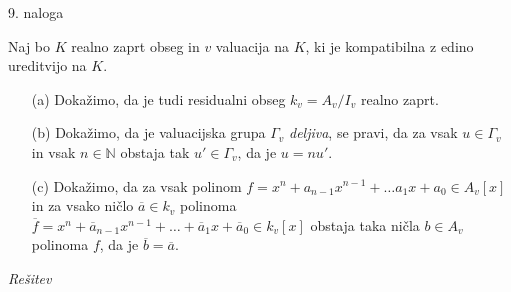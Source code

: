 \documentclass[a4paper, 12pt]{article}
\newcommand{\N}{\mathbb{N}}
\begin{document}
\begin{flushleft}
9. naloga
\end{flushleft}
Naj bo $K$ realno zaprt obseg in $v$ valuacija na $K$, ki je kompatibilna z edino ureditvijo na $K$. 
\begin{enumerate}
\item[(a)] Dokažimo, da je tudi residualni obseg $k_v = A_v / I_v$ realno zaprt.
\item[(b)] Dokažimo, da je valuacijska grupa $\Gamma_v$ \emph{deljiva}, se pravi, da za vsak $u \in \Gamma_v$ in vsak $n\in \N$ obstaja tak $u' \in \Gamma_v$, da je $u = nu'$.
\item[(c)] Dokažimo, da za vsak polinom $f=x^n + a_{n-1} x^{n-1} + \dots a_1 x + a_0 \in A_v[x]$ in za vsako ničlo $\overline{a} \in k_v$ polinoma  $\overline{f} =x^n + \overline{a}_{n-1} x^{n-1} + \dots +\overline{a}_1 x + \overline{a}_0 \in k_v[x]$ obstaja taka ničla $b\in A_v$ polinoma $f$, da je $\overline{b} = \overline{a}$.
\end{enumerate}
\emph{Rešitev}
\end{document}
